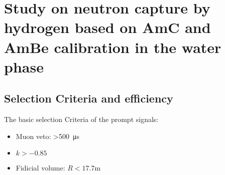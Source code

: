 \section{Study on neutron capture by hydrogen based on AmC and AmBe calibration in the water phase}

\subsection{Selection Criteria and efficiency}
The basic selection Criteria of the prompt signals:
\begin{itemize}
	\item Muon veto: >\SI{500}{\micro s}
	\item $k>-0.85$
	\item Fidicial volume: $R<17.7$\si{m}
\end{itemize}

